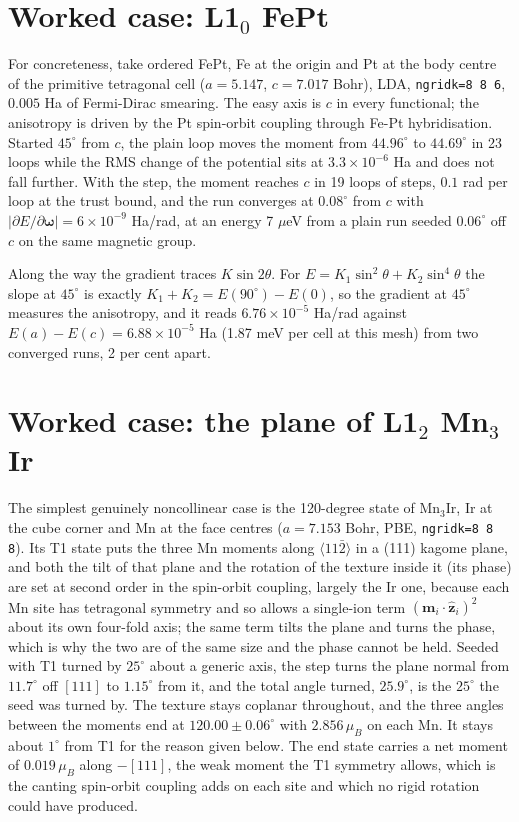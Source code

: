 \documentclass[11pt]{article}
\begin{document}
\section{Worked case: L1$_0$ FePt}

For concreteness, take ordered FePt, Fe at the origin and Pt at the body
centre of the primitive tetragonal cell ($a=5.147$, $c=7.017$ Bohr), LDA,
\texttt{ngridk=8 8 6}, $0.005$ Ha of Fermi-Dirac smearing. The easy axis is $c$
in every functional; the anisotropy is driven by the Pt spin-orbit coupling
through Fe-Pt hybridisation. Started $45^\circ$ from $c$, the plain loop moves
the moment from $44.96^\circ$ to $44.69^\circ$ in 23 loops while the RMS change
of the potential sits at $3.3\times10^{-6}$ Ha and does not fall further. With
the step, the moment reaches $c$ in 19 loops of steps, $0.1$ rad per loop at
the trust bound, and the run converges at $0.08^\circ$ from $c$ with
$|\partial E/\partial\boldsymbol\omega|=6\times10^{-9}$ Ha/rad, at an energy
7 $\mu$eV from a plain run seeded $0.06^\circ$ off $c$ on the same magnetic
group.

Along the way the gradient traces $K\sin2\theta$. For
$E=K_1\sin^2\theta+K_2\sin^4\theta$ the slope at $45^\circ$ is exactly
$K_1+K_2=E(90^\circ)-E(0)$, so the gradient at $45^\circ$ measures the
anisotropy, and it reads $6.76\times10^{-5}$ Ha/rad against $E(a)-E(c)=
6.88\times10^{-5}$ Ha (1.87 meV per cell at this mesh) from two converged runs,
2 per cent apart.

\section{Worked case: the plane of L1$_2$ Mn$_3$Ir}

The simplest genuinely noncollinear case is the 120-degree state of Mn$_3$Ir,
Ir at the cube corner and Mn at the face centres ($a=7.153$ Bohr, PBE,
\texttt{ngridk=8 8 8}). Its T1 state puts the three Mn moments along
$\langle11\bar2\rangle$ in a (111) kagome plane, and both the tilt of that
plane and the rotation of the texture inside it (its phase) are set at second
order in the spin-orbit coupling, largely the Ir one, because each Mn site has
tetragonal symmetry and so allows a single-ion term $(\mathbf m_i\cdot\hat{\mathbf
z}_i)^2$ about its own four-fold axis; the same term tilts the plane and turns
the phase, which is why the two are of the same size and the phase cannot be
held.
Seeded with T1 turned by $25^\circ$ about a generic axis, the step turns the
plane normal from $11.7^\circ$ off $[111]$ to $1.15^\circ$ from it, and the
total angle turned, $25.9^\circ$, is the $25^\circ$ the seed was turned by. The
texture stays coplanar throughout, and the three angles between the moments
end at $120.00\pm0.06^\circ$ with $2.856\,\mu_B$ on each Mn. It stays about
$1^\circ$ from T1 for the reason given below. The end state carries a net moment of
$0.019\,\mu_B$ along $-[111]$, the weak moment the T1 symmetry allows, which is
the canting spin-orbit coupling adds on each site and which no rigid rotation
could have produced.
\end{document}

